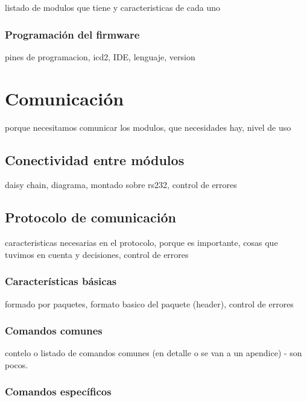 listado de modulos que tiene y caracteristicas de cada uno

\subsubsection{Programaci\'on del firmware}
\label{h_controlador_micro_programacion}

pines de programacion, icd2, IDE, lenguaje, version

\section{Comunicaci\'on}
\label{h_comm}

porque necesitamos comunicar los modulos, que necesidades hay, nivel de uso

\subsection{Conectividad entre m\'odulos}
\label{h_comm_conectividad}

daisy chain, diagrama, montado sobre rs232, control de errores

\subsection{Protocolo de comunicaci\'on}
\label{h_comm_protocolo}

caracteristicas necesarias en el protocolo, porque es importante, cosas que tuvimos en cuenta y decisiones, control de errores

\subsubsection{Caracter\'isticas b\'asicas}
\label{h_comm_protocolo_caracteristicas}

formado por paquetes, formato basico del paquete (header), control de errores

\subsubsection{Comandos comunes}
\label{h_comm_protocolo_comandosComunes}

contelo o listado de comandos comunes (en detalle o se van a un apendice) - son pocos.

\subsubsection{Comandos espec\'ificos}
\label{h_comm_protocolo_comandosEspecificos}

